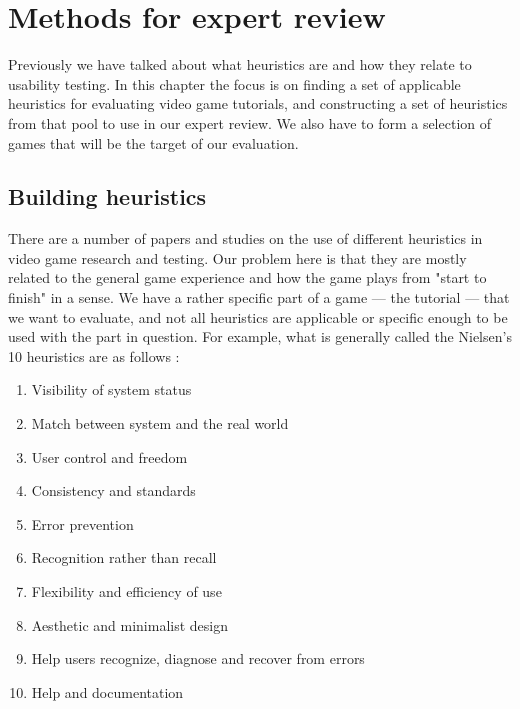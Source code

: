 \chapter{Methods for expert review}
Previously we have talked about what heuristics are and how they relate to usability testing. In this chapter the focus is on finding a set of applicable heuristics for evaluating video game tutorials, and constructing a set of heuristics from that pool to use in our expert review. We also have to form a selection of games that will be the target of our evaluation.

\section{Building heuristics}
There are a number of papers and studies on the use of different heuristics in video game research and testing. Our problem here is that they are mostly related to the general game experience and how the game plays from "start to finish" in a sense. We have a rather specific part of a game --- the tutorial --- that we want to evaluate, and not all heuristics are applicable or specific enough to be used with the part in question. For example, what is generally called the Nielsen's 10 heuristics are as follows \cite{Nielsen1993}: 

\begin{enumerate}
	\item Visibility of system status
	\item Match between system and the real world
	\item User control and freedom
	\item Consistency and standards
	\item Error prevention
	\item Recognition rather than recall
	\item Flexibility and efficiency of use
	\item Aesthetic and minimalist design
	\item Help users recognize, diagnose and recover from errors
	\item Help and documentation
\end{enumerate}

